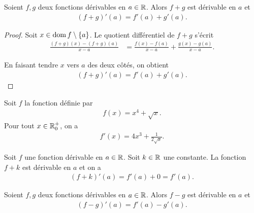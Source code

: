 \documentclass[main.tex]{subfiles}
\begin{document}
\begin{proposition}

    Soient $f, g$ deux fonctions dérivables en $a \in \mathbb{R}$.
    Alors $f + g$ est dérivable en $a$ et
    \begin{align}
        (f + g)'(a) = f'(a) + g'(a).
    \end{align}
\end{proposition}
\begin{proof}
    Soit $x \in \operatorname{dom} f \setminus \{a\}$.
    Le quotient différentiel de $f + g$ s'écrit
    \begin{align}
        \frac {(f + g)(x) - (f + g)(a)} {x - a}
        &= \frac {f(x) - f(a)} {x - a} + \frac {g(x) - g(a)} {x - a}.
    \end{align}

    En faisant tendre $x$ vers $a$ des deux côtés,
    on obtient
    \begin{align}
        (f + g)'(a) = f'(a) + g'(a).
    \end{align}
\end{proof}

\begin{example}
    Soit $f$ la fonction définie par 
    \begin{align}
        f(x) = x^4 + \sqrt x.
    \end{align}
    Pour tout $x \in \mathbb{R}_0^+$, on a 
    \begin{align}
        f'(x) = 4x^3 + \frac{1}{2\sqrt x}.
    \end{align}
\end{example}

\begin{example}
    [Dérivée de $f(x) + k$]
    Soit $f$ une fonction dérivable en $a \in \mathbb{R}$.
    Soit $k \in \mathbb{R}$ une constante. 
    La fonction $f + k$ est dérivable en $a$ et on a 
    \begin{align}
        (f + k)'(a) = f'(a) + 0 = f'(a).
    \end{align}
\end{example}

\begin{proposition}

    Soient $f, g$ deux fonctions dérivables en $a \in \mathbb{R}$.
    Alors $f - g$ est dérivable en $a$ et
    \begin{align}
        (f - g)'(a) = f'(a) - g'(a).
    \end{align}
\end{proposition}
\end{document}
